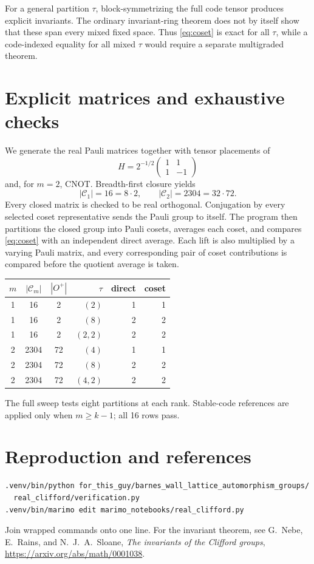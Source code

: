 \documentclass[11pt]{article}
\begin{document}
For a general partition $\tau$, block-symmetrizing the full code tensor
produces explicit invariants.  The ordinary invariant-ring theorem does not
by itself show that these span every mixed fixed space.  Thus \eqref{eq:coset}
is exact for all $\tau$, while a code-indexed equality for all mixed $\tau$
would require a separate multigraded theorem.

\section{Explicit matrices and exhaustive checks}
We generate the real Pauli matrices together with tensor placements of
\[
 H=2^{-1/2}\begin{pmatrix}1&1\\1&-1\end{pmatrix}
\]
and, for $m=2$, CNOT.  Breadth-first closure yields
\[
|\mathcal C_1|=16=8\cdot2,
\qquad |\mathcal C_2|=2304=32\cdot72.
\]
Every closed matrix is checked to be real orthogonal.  Conjugation by every
selected coset representative sends the Pauli group to itself.  The program
then partitions the closed group into Pauli cosets, averages each coset, and
compares \eqref{eq:coset} with an independent direct average.  Each lift is
also multiplied by a varying Pauli matrix, and every corresponding pair of
coset contributions is compared before the quotient average is taken.

\begin{center}
\begin{tabular}{@{}cccrrr@{}}\toprule
$m$&$|\mathcal C_m|$&$|O^+|$&$\tau$&direct&coset\\\midrule
1&16&2&$(2)$&1&1\\
1&16&2&$(8)$&2&2\\
1&16&2&$(2,2)$&2&2\\
2&2304&72&$(4)$&1&1\\
2&2304&72&$(8)$&2&2\\
2&2304&72&$(4,2)$&2&2\\\bottomrule
\end{tabular}
\end{center}
The full sweep tests eight partitions at each rank.  Stable-code references
are applied only when $m\geq k-1$; all 16 rows pass.

\section{Reproduction and references}
\begin{verbatim}
.venv/bin/python for_this_guy/barnes_wall_lattice_automorphism_groups/
  real_clifford/verification.py
.venv/bin/marimo edit marimo_notebooks/real_clifford.py
\end{verbatim}
Join wrapped commands onto one line.  For the invariant theorem, see
G.~Nebe, E.~Rains, and N.~J.~A.~Sloane,
\emph{The invariants of the Clifford groups},
\url{https://arxiv.org/abs/math/0001038}.
\end{document}
